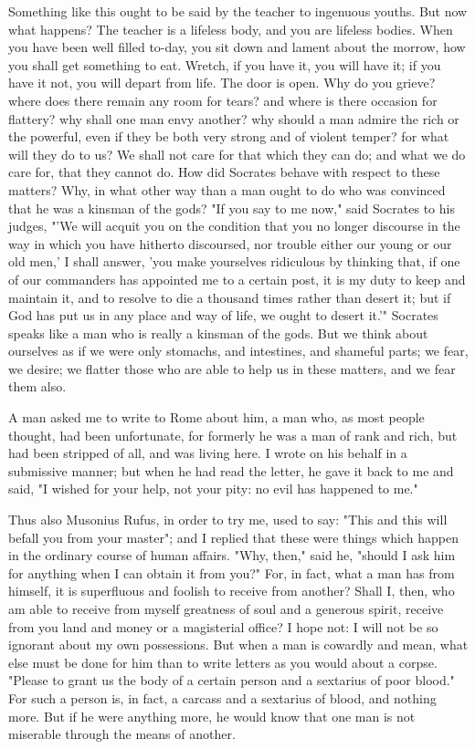 \documentclass[a4paper]{article}
\begin{document}
Something like this ought to be said by the teacher to ingenuous youths.
But now what happens? The teacher is a lifeless body, and you are
lifeless bodies. When you have been well filled to-day, you sit down
and lament about the morrow, how you shall get something to eat. Wretch,
if you have it, you will have it; if you have it not, you will depart
from life. The door is open. Why do you grieve? where does there remain
any room for tears? and where is there occasion for flattery? why
shall one man envy another? why should a man admire the rich or the
powerful, even if they be both very strong and of violent temper?
for what will they do to us? We shall not care for that which they
can do; and what we do care for, that they cannot do. How did Socrates
behave with respect to these matters? Why, in what other way than
a man ought to do who was convinced that he was a kinsman of the gods?
"If you say to me now," said Socrates to his judges, "'We will acquit
you on the condition that you no longer discourse in the way in which
you have hitherto discoursed, nor trouble either our young or our
old men,' I shall answer, 'you make yourselves ridiculous by thinking
that, if one of our commanders has appointed me to a certain post,
it is my duty to keep and maintain it, and to resolve to die a thousand
times rather than desert it; but if God has put us in any place and
way of life, we ought to desert it.'" Socrates speaks like a man who
is really a kinsman of the gods. But we think about ourselves as if
we were only stomachs, and intestines, and shameful parts; we fear,
we desire; we flatter those who are able to help us in these matters,
and we fear them also. 

A man asked me to write to Rome about him, a man who, as most people
thought, had been unfortunate, for formerly he was a man of rank and
rich, but had been stripped of all, and was living here. I wrote on
his behalf in a submissive manner; but when he had read the letter,
he gave it back to me and said, "I wished for your help, not your
pity: no evil has happened to me." 

Thus also Musonius Rufus, in order to try me, used to say: "This and
this will befall you from your master"; and I replied that these were
things which happen in the ordinary course of human affairs. "Why,
then," said he, "should I ask him for anything when I can obtain it
from you?" For, in fact, what a man has from himself, it is superfluous
and foolish to receive from another? Shall I, then, who am able to
receive from myself greatness of soul and a generous spirit, receive
from you land and money or a magisterial office? I hope not: I will
not be so ignorant about my own possessions. But when a man is cowardly
and mean, what else must be done for him than to write letters as
you would about a corpse. "Please to grant us the body of a certain
person and a sextarius of poor blood." For such a person is, in fact,
a carcass and a sextarius of blood, and nothing more. But if he were
anything more, he would know that one man is not miserable through
the means of another. 
\end{document}
